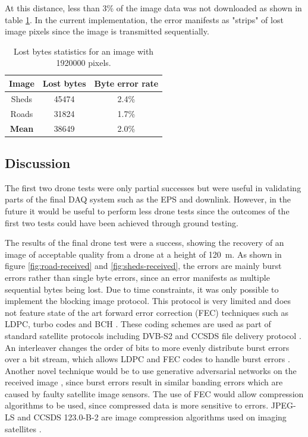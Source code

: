 \documentclass[]{report}
\begin{document}
At this distance, less than 3\% of the image data was not downloaded as shown in table \ref{tabl:image-lost-stats}. In the current implementation, the error manifests as "strips" of lost image pixels since the image is transmitted sequentially.

\begin{table}[H]
  \centering
  \begin{tabular}{|c|c|c|}
    \hline
    \textbf{Image} & \textbf{Lost bytes} & \textbf{Byte error rate} \\\hline
    Sheds          & 45474               & 2.4\%                    \\\hline
    Roads          & 31824               & 1.7\%                    \\\hline
    \textbf{Mean}  & 38649               & 2.0\%                    \\\hline
  \end{tabular}
  \caption{Lost bytes statistics for an image with 1920000 pixels.}
  \label{tabl:image-lost-stats}
\end{table}

\subsection{Discussion}

The first two drone tests were only partial successes but were useful in validating parts of the final DAQ system such as the EPS and downlink. However, in the future it would be useful to perform less drone tests since the outcomes of the first two tests could have been achieved through ground testing.

The results of the final drone test were a success, showing the recovery of an image of acceptable quality from a drone at a height of \SI{120}{\metre}. As shown in figure \ref{fig:road-received} and \ref{fig:sheds-received}, the errors are mainly burst errors rather than single byte errors, since an error manifests as multiple sequential bytes being lost. Due to time constraints, it was only possible to implement the blocking image protocol. This protocol is very limited and does not feature state of the art forward error correction (FEC) techniques such as LDPC, turbo codes and BCH \cite{10224067}. These coding schemes are used as part of standard satellite protocols including DVB-S2 and CCSDS file delivery protocol \cite{10224067}. An interleaver changes the order of bits to more evenly distribute burst errors over a bit stream, which allows LDPC and FEC codes to handle burst errors \cite{sonali2021capacity}. Another novel technique would be to use generative adversarial networks on the received image \cite{10131946}, since burst errors result in similar banding errors which are caused by faulty satellite image sensors. The use of FEC would allow compression algorithms to be used, since compressed data is more sensitive to errors. JPEG-LS and CCSDS 123.0-B-2 are image compression algorithms used on imaging satellites \cite{9352211}.
\end{document}
